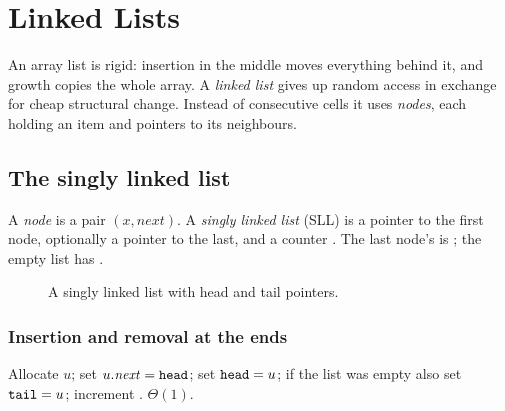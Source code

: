 \chapter{Linked Lists}\label{ch:linked}

An array list is rigid: insertion in the middle moves everything behind it, and growth
copies the whole array. A \emph{linked list} gives up random access in exchange for cheap
structural change. Instead of consecutive cells it uses \emph{nodes}, each holding an item
and pointers to its neighbours.

\section{The singly linked list}

\begin{definition}
A \emph{node} is a pair $(x,\mathit{next})$. A \emph{singly linked list} (SLL) is a pointer
 to the first node, optionally a pointer  to the last, and a counter
. The last node's  is ; the empty list has .
\end{definition}

\begin{figure}[ht]\centering
{}
\caption{A singly linked list with head and tail pointers.}
\end{figure}


\subsection{Insertion and removal at the ends}

 Allocate $u$; set $u.\mathit{next}=\texttt{head}$; set
$\texttt{head}=u$; if the list was empty also set $\texttt{tail}=u$; increment .
$\Theta(1)$.

